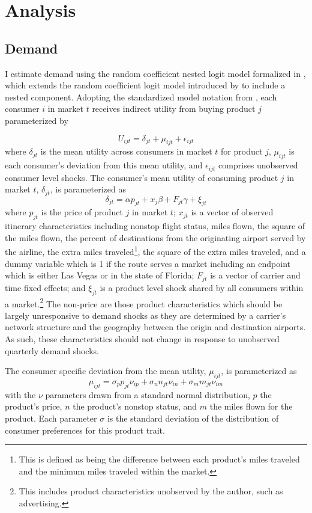 \documentclass{article}
\begin{document}
	\section{Analysis}
	\label{sec:Analysis} 	 
 	 	 
	\subsection{Demand}
	\label{sec:Analysis_Demand}
	I estimate demand using the random coefficient nested logit model formalized in \citet{grigolon_nested_2014}, which extends the random coefficient logit model introduced by \citet{berry_automobile_1995} to include a nested component.  Adopting the standardized model notation from \citet{conlon_best_2020}, each consumer $i$ in market $t$ receives indirect utility from buying product $j$ parameterized by 
	
	\[U_{ijt} = \delta_{jt} + \mu_{ijt} + \epsilon_{ijt}\] where $\delta_{jt}$ is the mean utility across consumers in market $t$ for product $j$, $\mu_{ijt}$ is each consumer's deviation from this mean utility, and $\epsilon_{ijt}$ comprises unobserved consumer level shocks. The consumer's mean utility of consuming product $j$ in market $t$,  $\delta_{jt}$, is parameterized as \[\delta_{jt} = \alpha p_{jt} + x_{j} \beta + F_{jt}\gamma  +  \xi_{jt}\] where $p_{jt}$ is the price of product $j$ in market $t$; $x_{jt}$ is a vector of observed itinerary characteristics including nonstop flight status, miles flown, the square of the miles flown, the percent of destinations from the originating airport served by the airline, the extra miles traveled\footnote{This is defined as being the difference between each product's miles traveled and the minimum miles traveled within the market.}, the square of the extra miles traveled, and a dummy variable which is 1 if the route serves a market including an endpoint which is either Las Vegas or in the state of Florida; $F_{jt}$ is a vector of carrier and time fixed effects; and $\xi_{jt}$ is a product level shock shared by all consumers within a market.\footnote{This includes product characteristics unobserved by the author, such as advertising.} The non-price are those product characteristics which should be largely unresponsive to demand shocks as they are determined by a carrier's network structure and the geography between the origin and destination airports. As such, these characteristics should not change in response to unobserved quarterly demand shocks.
	 
    The consumer specific deviation from the mean utility, $\mu_{ijt}$, is parameterized as \[\mu_{ijt} = \sigma_{p} p_{jt} \nu_{ip} + \sigma_{n} n_{jt} \nu_{in} + \sigma_{m} m_{jt} \nu_{im} \] with the $\nu$ parameters drawn from a standard normal distribution, $p$ the product's price, $n$ the product's nonstop status, and $m$ the miles flown for the product. Each parameter $\sigma$ is the standard deviation of the distribution of consumer preferences for this product trait.  
    
\end{document}
